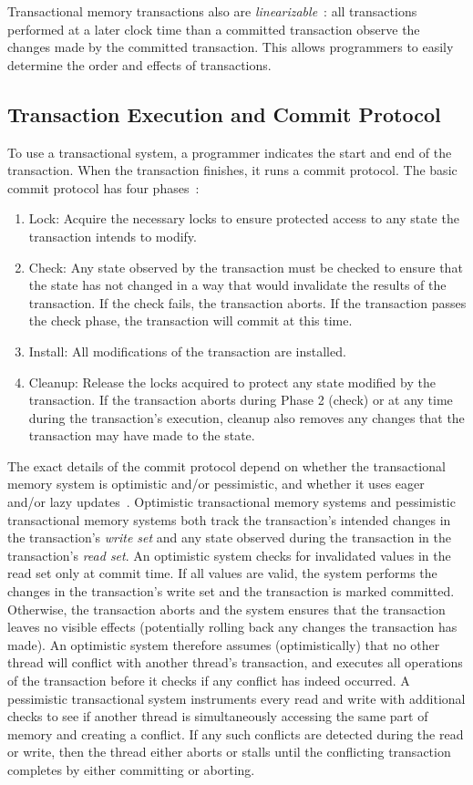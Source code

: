 Transactional memory transactions also are \emph{linearizable}~\cite{linearizability}: all transactions performed at a later clock time than a committed transaction observe the changes made by the committed transaction. This allows programmers to easily determine the order and effects of transactions.

\subsection{Transaction Execution and Commit Protocol}
To use a transactional system, a programmer indicates the start and end of the transaction. When the transaction finishes, it runs a commit protocol. The basic commit protocol has four phases~\cite{harristm}:
\begin{enumerate}
    \item Lock: Acquire the necessary locks to ensure protected access to any state the transaction intends to modify.
    \item Check: Any state observed by the transaction must be checked to ensure that the state has not changed in a way that would invalidate the results of the transaction. If the check fails, the transaction aborts. If the transaction passes the check phase, the transaction will commit at this time.
    \item Install: All modifications of the transaction are installed.
    \item Cleanup: Release the locks acquired to protect any state modified by the transaction. If the transaction aborts during Phase 2 (check) or at any time during the transaction's execution, cleanup also removes any changes that the transaction may have made to the state.
\end{enumerate}

The exact details of the commit protocol depend on whether the transactional memory system is optimistic and/or pessimistic, and whether it uses eager and/or lazy updates~\cite{harristm}. 
Optimistic transactional memory systems and pessimistic transactional memory systems both track the transaction's intended changes in the transaction's \emph{write set} and any state observed during the transaction in the transaction's \emph{read set}. 
An optimistic system checks for invalidated values in the read set only at commit time. If all values are valid, the system performs the changes in the transaction's write set and the transaction is marked committed. Otherwise, the transaction aborts and the system ensures that the transaction leaves no visible effects (potentially rolling back any changes the transaction has made). An optimistic system therefore assumes (optimistically) that no other thread will conflict with another thread's transaction, and executes all operations of the transaction before it checks if any conflict has indeed occurred.
A pessimistic transactional system instruments every read and write with additional checks to see if another thread is simultaneously accessing the same part of memory and creating a conflict. If any such conflicts are detected during the read or write, then the thread either aborts or stalls until the conflicting transaction completes by either committing or aborting.

